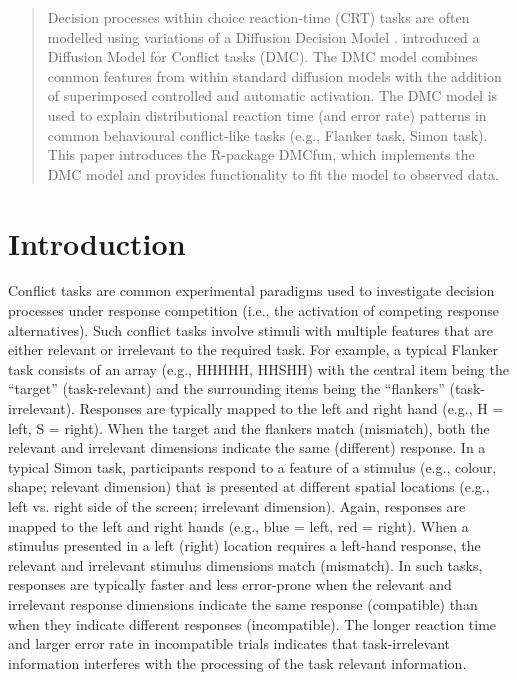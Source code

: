 \date{Received: date / Accepted: date}
\maketitle

\begin{abstract}

    Decision processes within choice reaction-time (CRT) tasks are often
    modelled using variations of a Diffusion Decision Model \parencite[DDM, for
    a review, see][] {ratcliff2008diffusion}. \textcite{ulrich2015automatic}
    introduced a Diffusion Model for Conflict tasks (DMC). The DMC model
    combines common features from within standard diffusion models with the
    addition of superimposed controlled and automatic activation. The DMC model
    is used to explain distributional reaction time (and error rate) patterns
    in common behavioural conflict-like tasks (e.g., Flanker task, Simon task).
    This paper introduces the R-package DMCfun, which implements the DMC model
    and provides functionality to fit the model to observed data.


\end{abstract}

\section{Introduction}
\label{introduction}

Conflict tasks \parencite[e.g., Flanker task, Simon task, Stroop task,
see][, respectively]{eriksen1974effects, lu1995influence, macleod1991half} are
common experimental paradigms used to investigate decision processes under
response competition (i.e., the activation of competing response alternatives).
Such conflict tasks involve stimuli with multiple features that are either
relevant or irrelevant to the required task. For example, a typical Flanker
task consists of an array (e.g., HHHHH, HHSHH) with the central item being the
``target'' (task-relevant) and the surrounding items being the
``flankers'' (task-irrelevant). Responses are typically mapped to the left and
right hand (e.g., H = left, S = right). When the target and the flankers match
(mismatch), both the relevant and irrelevant dimensions indicate the same
(different) response. In a typical Simon task, participants respond to a
feature of a stimulus (e.g., colour, shape; relevant dimension) that is
presented at different spatial locations (e.g., left vs. right side of the
screen; irrelevant dimension). Again, responses are mapped to the left and
right hands (e.g., blue = left, red = right). When a stimulus presented in a
left (right) location requires a left-hand response, the relevant and
irrelevant stimulus dimensions match (mismatch). In such tasks, responses are
typically faster and less error-prone when the relevant and irrelevant response
dimensions indicate the same response (compatible) than when they indicate
different responses (incompatible). The longer reaction time and larger error
rate in incompatible trials indicates that task-irrelevant information
interferes with the processing of the task relevant information.

